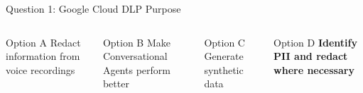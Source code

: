 \documentclass[aspectratio=169]{beamer}
\begin{document}
\begin{frame}{Question 1: Google Cloud DLP Purpose}
    \begin{center}
    \end{center}
    
    \vspace{1em}
    
    \begin{columns}
        \begin{block}{Option A}
            \textcolor{googlered}{\faTimesCircle} Redact information from voice recordings
        \end{block}
        
        \begin{block}{Option B}
            \textcolor{googlered}{\faTimesCircle} Make Conversational Agents perform better
        \end{block}
        
        \begin{block}{Option C}
            \textcolor{googlered}{\faTimesCircle} Generate synthetic data
        \end{block}
        
        \begin{block}{Option D}
            \textcolor{googlegreen}{\faCheckCircle} \textbf{Identify PII and redact where necessary}
        \end{block}
    \end{columns}
\end{frame}
\end{document}
